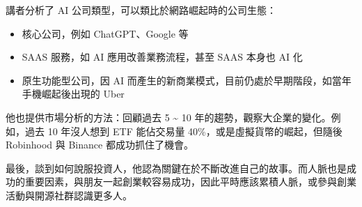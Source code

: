 \documentclass{homework}
\begin{document}
講者分析了 AI 公司類型，可以類比於網路崛起時的公司生態：

\begin{itemize}
    \item 核心公司，例如 ChatGPT、Google 等
    \item SAAS 服務，如 AI 應用改善業務流程，甚至 SAAS 本身也 AI 化
    \item 原生功能型公司，因 AI 而產生的新商業模式，目前仍處於早期階段，如當年手機崛起後出現的 Uber
\end{itemize}

他也提供市場分析的方法：回顧過去 5 \~{} 10 年的趨勢，觀察大企業的變化。例如，過去 10 年沒人想到 ETF 能佔交易量 40\%，或是虛擬貨幣的崛起，但隨後 Robinhood 與 Binance 都成功抓住了機會。

最後，談到如何說服投資人，他認為關鍵在於不斷改進自己的故事。而人脈也是成功的重要因素，與朋友一起創業較容易成功，因此平時應該累積人脈，或參與創業活動與開源社群認識更多人。
\end{document}
